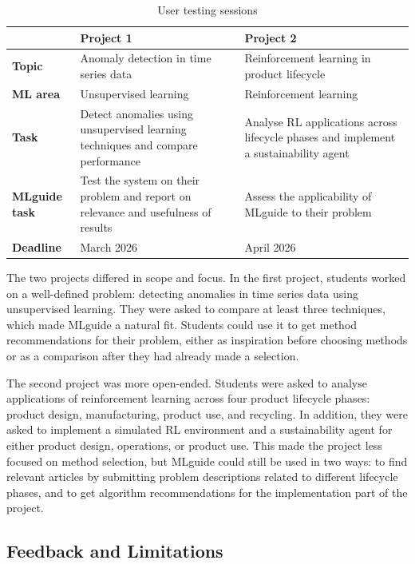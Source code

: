 \begin{table}[H]
\centering
\caption{User testing sessions}
\label{tab:user-testing}
\begin{tabular}{l p{5.5cm} p{5.5cm}}
\toprule
 & \textbf{Project 1} & \textbf{Project 2} \\
\midrule
\textbf{Topic} & Anomaly detection in time series data & Reinforcement learning in product lifecycle \\
\addlinespace
\textbf{ML area} & Unsupervised learning & Reinforcement learning \\
\addlinespace
\textbf{Task} & Detect anomalies using unsupervised learning techniques and compare performance & Analyse RL applications across lifecycle phases and implement a sustainability agent \\
\addlinespace
\textbf{MLguide task} & Test the system on their problem and report on relevance and usefulness of results & Assess the applicability of MLguide to their problem \\
\addlinespace
\textbf{Deadline} & March 2026 & April 2026 \\
\bottomrule
\end{tabular}
\end{table}

The two projects differed in scope and focus. In the first project, students 
worked on a well-defined problem: detecting anomalies in time series data using 
unsupervised learning. They were asked to compare at least three techniques, 
which made MLguide a natural fit. Students could use it to get method 
recommendations for their problem, either as inspiration before choosing 
methods or as a comparison after they had already made a selection.

The second project was more open-ended. Students were asked to analyse 
applications of reinforcement learning across four product lifecycle phases: 
product design, manufacturing, product use, and recycling. In addition, 
they were asked to implement a simulated RL environment and a sustainability 
agent for either product design, operations, or product use. 
This made the project less focused on method selection, 
but MLguide could still be used in two ways: to find relevant articles by 
submitting problem descriptions related to different lifecycle phases, 
and to get algorithm recommendations for the implementation part of the project.

\subsection{Feedback and Limitations}

